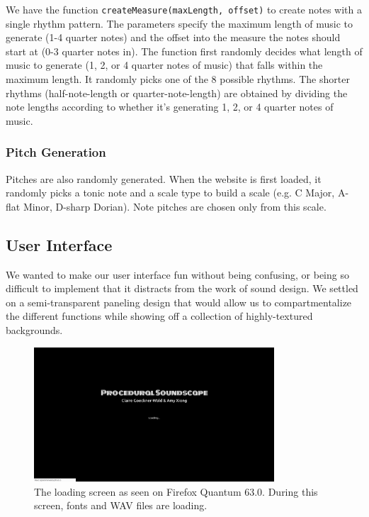 \documentclass[12pt,a4paper]{article}
\newcommand{\lightcode}[1]{\colorbox{light-gray}{\texttt{#1}}}
\begin{document}
We have the function \lightcode{createMeasure(maxLength, offset)} to create notes with a single rhythm pattern. The parameters specify the maximum length of music to generate (1-4 quarter notes) and the offset into the measure the notes should start at (0-3 quarter notes in). The function first randomly decides what length of music to generate (1, 2, or 4 quarter notes of music) that falls within the maximum length. It randomly picks one of the 8 possible rhythms. The shorter rhythms (half-note-length or quarter-note-length) are obtained by dividing the note lengths according to whether it's generating 1, 2, or 4 quarter notes of music.

\subsubsection{Pitch Generation}

Pitches are also randomly generated. When the website is first loaded, it randomly picks a tonic note and a scale type to build a scale (e.g. C Major, A-flat Minor, D-sharp Dorian). Note pitches are chosen only from this scale. 

\subsection{User Interface}
We wanted to make our user interface fun without being confusing, or being so difficult to implement that it distracts from the work of sound design. We settled on a semi-transparent paneling design that would allow us to compartmentalize the different functions while showing off a collection of highly-textured backgrounds.

\begin{figure}
\centering\includegraphics[width=0.8\textwidth]{images/loading.png}
\caption{The loading screen as seen on Firefox Quantum 63.0. During this screen, fonts and WAV files are loading.}
\end{figure}
\end{document}
